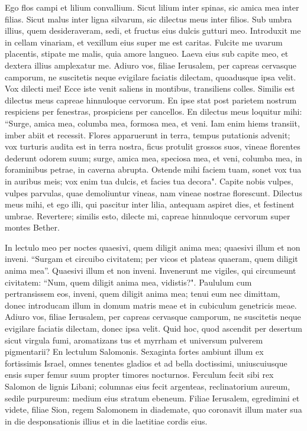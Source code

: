 \begin{biblechapter}  
\verse Ego flos campi et lilium convallium. 
\verse Sicut lilium inter spinas, sic amica mea inter filias. 
\verse Sicut malus inter ligna silvarum, sic dilectus meus inter filios. Sub umbra illius, quem desideraveram, sedi, et fructus eius dulcis gutturi meo. 
\verse Introduxit me in cellam vinariam, et vexillum eius super me est caritas. 
\verse Fulcite me uvarum placentis, stipate me malis, quia amore langueo. 
\verse Laeva eius sub capite meo, et dextera illius amplexatur me. 
\verse Adiuro vos, filiae Ierusalem, per capreas cervasque camporum, ne suscitetis neque evigilare faciatis dilectam, quoadusque ipsa velit. 
\verse Vox dilecti mei! Ecce iste venit saliens in montibus, transiliens colles. 
\verse Similis est dilectus meus capreae hinnuloque cervorum. En ipse stat post parietem nostrum respiciens per fenestras, prospiciens per cancellos. 
\verse En dilectus meus loquitur mihi: “Surge, amica mea, columba mea, formosa mea, et veni. 
\verse Iam enim hiems transiit, imber abiit et recessit. 
\verse Flores apparuerunt in terra, tempus putationis advenit; vox turturis audita est in terra nostra, 
\verse ficus protulit grossos suos, vineae florentes dederunt odorem suum; surge, amica mea, speciosa mea, et veni, 
\verse columba mea, in foraminibus petrae, in caverna abrupta. Ostende mihi faciem tuam, sonet vox tua in auribus meis; vox enim tua dulcis, et facies tua decora". 
\verse Capite nobis vulpes, vulpes parvulas, quae demoliuntur vineas, nam vineae nostrae florescunt. 
\verse Dilectus meus mihi, et ego illi, qui pascitur inter lilia, 
\verse antequam aspiret dies, et festinent umbrae. Revertere; similis esto, dilecte mi, capreae hinnuloque cervorum super montes Bether. 
\end{biblechapter}

\begin{biblechapter}  
\verse In lectulo meo per noctes quaesivi, quem diligit anima mea; quaesivi illum et non inveni. 
\verse “Surgam et circuibo civitatem; per vicos et plateas quaeram, quem diligit anima mea”. Quaesivi illum et non inveni. 
\verse Invenerunt me vigiles, qui circumeunt civitatem: “Num, quem diligit anima mea, vidistis?". 
\verse Paululum cum pertransissem eos, inveni, quem diligit anima mea; tenui eum nec dimittam, donec introducam illum in domum matris meae et in cubiculum genetricis meae. 
\verse Adiuro vos, filiae Ierusalem, per capreas cervasque camporum, ne suscitetis neque evigilare faciatis dilectam, donec ipsa velit. 
\verse Quid hoc, quod ascendit per desertum sicut virgula fumi, aromatizans tus et myrrham et universum pulverem pigmentarii? 
\verse En lectulum Salomonis. Sexaginta fortes ambiunt illum ex fortissimis Israel, 
\verse omnes tenentes gladios et ad bella doctissimi, uniuscuiusque ensis super femur suum propter timores nocturnos. 
\verse Ferculum fecit sibi rex Salomon de lignis Libani; 
\verse columnas eius fecit argenteas, reclinatorium aureum, sedile purpureum: medium eius stratum ebeneum. Filiae Ierusalem, 
\verse egredimini et videte, filiae Sion, regem Salomonem in diademate, quo coronavit illum mater sua in die desponsationis illius et in die laetitiae cordis eius. 
\end{biblechapter}

